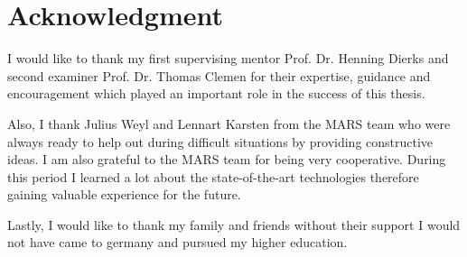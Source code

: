 \newpage
\thispagestyle{empty}
\section*{Acknowledgment}
I would like to thank my first supervising mentor Prof. Dr. Henning Dierks and second examiner Prof. Dr. Thomas Clemen for their expertise, guidance and 
encouragement which played an important role in the success of this thesis. 

Also, I thank Julius Weyl and Lennart Karsten from the MARS team who were always ready to help out during difficult situations by providing constructive
ideas. I am also grateful to the MARS team for being very cooperative. During this period I learned a lot about the state-of-the-art technologies therefore
gaining valuable experience for the future.

Lastly, I would like to thank my family and friends without their support I would not have came to germany and pursued my higher education.
